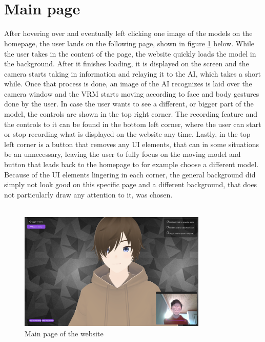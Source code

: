 \\
\\
\section{Main page}
After hovering over and eventually left clicking one image of the models on the homepage,
the user lands on the following page, shown in figure \ref{fig:mainpage} below. While the user takes in
the content of the page, the website quickly loads the model in the background. After it
finishes loading, it is displayed on the screen and the camera starts taking in information
and relaying it to the AI, which takes a short while. Once that process is done, an image
of the AI recognizes is laid over the camera window and the VRM starts moving according
to face and body gestures done by the user. In case the user wants to see a different, or
bigger part of the model, the controls are shown in the top right corner. The recording
feature and the controls to it can be found in the bottom left corner, where the user can
start or stop recording what is displayed on the website any time. Lastly, in the top left
corner is a button that removes any UI elements, that can in some situations be an unnecessary,
leaving the user to fully focus on the moving model and button that leads back to the homepage
to for example choose a different model. Because of the UI elements lingering in each corner,
the general background did simply not look good on this specific page and a different background,
that does not particularly draw any attention to it, was chosen.
\\
\\
\begin{figure}[htb]
    \centering
    \includegraphics[width=0.8\textwidth]{pics/Animotion_mainpage.png}
    \caption{Main page of the website}
    \label{fig:mainpage}
\end{figure}
\\
\\
